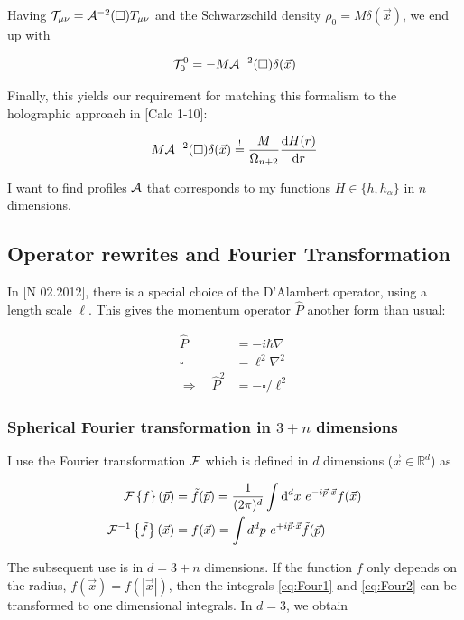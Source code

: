 \documentclass[10pt,a4paper, fleqn]{article}
\begin{document}
Having ${\cal T}_{\mu\nu} = {\cal A}^{-2}(\square) T_{\mu\nu}$ and the Schwarzschild density $\rho_0 = M\delta(\vec x)$, we end up with

\begin{equation}
{\cal T}^0_0 = -M {\cal A}^{-2}(\square) \delta(\vec x)
\end{equation}

Finally, this yields our requirement for matching this formalism to the holographic approach in [Calc 1-10]:

\begin{equation}
M {\cal A}^{-2}(\square) \delta(\vec x) \stackrel{!}{=} \frac M{\Omega_{n+2}} \frac{\mathrm{d} H(r)}{\mathrm{d} r}  \label{eq:Master}
\end{equation}

I want to find profiles ${\cal A}$ that corresponds to my functions $H \in \{ h, h_\alpha\}$ in $n$ dimensions.

\subsection{Operator rewrites and Fourier Transformation}
In [N 02.2012], there is a special choice of the D'Alambert operator, using a length scale $\ell$. This gives the momentum operator $\hat P$ another form than usual:

\begin{align}
\hat P &= - i \hbar \nabla \\
\square &= \ell^2 \nabla^2 \\
\Rightarrow\quad \hat P^2 &= - \square / \ell^2 \label{eq:thep}
\end{align}

\subsubsection{Spherical Fourier transformation in $3+n$ dimensions}
I use the Fourier transformation ${\cal F}$ which is defined in $d$ dimensions ($\vec x \in \mathbb R^d$) as

\begin{align}
{\cal F}\left\{ f \right\}(\vec p) &= \tilde f(\vec p) = \frac 1{(2\pi)^d} \int \mathrm{d}^d x~e^{-i\vec p \cdot \vec x} f(\vec x) \label{eq:Four1} \\
{\cal F}^{-1}\left\{ \tilde f \right\}(\vec x) &= f(\vec x) =   \int d^d p~e^{+i \vec p \cdot \vec x} \tilde f(\vec p) \label{eq:Four2}
\end{align}

The subsequent use is in $d=3+n$ dimensions. If the function $f$ only depends on the radius, $f(\vec x)=f(|\vec  x|)$, then the integrals \ref{eq:Four1} and \ref{eq:Four2} can be transformed to one dimensional integrals. In $d=3$, we obtain
\end{document}
